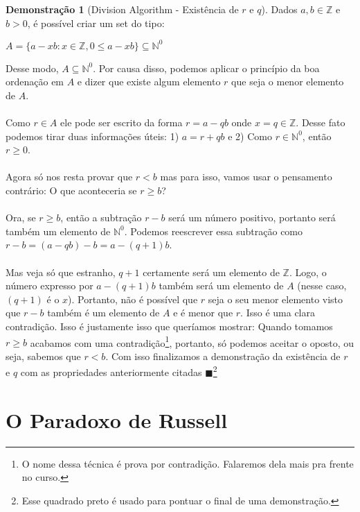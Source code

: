 \documentclass[a4paper,11pt]{book}
\theoremstyle{definition}
\theoremstyle{break}
\newtheorem{demonstration}{Demonstração}[section]
\begin{document}
\begin{demonstration}[Division Algorithm - Existência de $r$ e $q$]
Dados $a,b \in \mathbb{Z}$ e $b > 0$, é possível criar um set do tipo:
\begin{center}
	$ A = \{ a - xb : x \in \mathbb{Z}, 0 \leq a - xb \} \subseteq \mathbb{N}^0 $
\end{center}
Desse modo, $A \subseteq \mathbb{N}^0$. Por causa disso, podemos aplicar o princípio da boa ordenação em $A$ e dizer que existe algum elemento $r$ que seja o menor elemento de $A$.
\\
\\
Como $r \in A$ ele pode ser escrito da forma $r = a - qb$ onde $x = q \in \mathbb{Z}$. Desse fato podemos tirar duas informações úteis: 1) $a = r + qb$ e 2) Como $r \in \mathbb{N}^0$, então $r \geq 0$.
\\
\\
Agora só nos resta provar que $r < b$ mas para isso, vamos usar o pensamento contrário: O que aconteceria se $r \geq b$?
\\
\\
Ora, se $r \geq b$, então a subtração $r - b$ será um número positivo, portanto será também um elemento de $\mathbb{N}^0$. Podemos reescrever essa subtração como $r - b = (a - qb) - b = a - (q + 1)b$. 
\\
\\
Mas veja só que estranho, $q + 1$ certamente será um elemento de $\mathbb{Z}$. Logo, o número expresso por $a - (q + 1)b$ também será um elemento de $A$ (nesse caso, $(q + 1)$ é o $x$). Portanto, não é possível que $r$ seja o seu menor elemento visto que $r - b$ também é um elemento de $A$ e é menor que $r$. Isso é uma clara contradição. Isso é justamente isso que queríamos mostrar: Quando tomamos $r \geq b$ acabamos com uma contradição\footnote{O nome dessa técnica é prova por contradição. Falaremos dela mais pra frente no curso.}, portanto, só podemos aceitar o oposto, ou seja, sabemos que $r < b$. Com isso finalizamos a demonstração da existência de $r$ e $q$ com as propriedades anteriormente citadas $\blacksquare$\footnote{Esse quadrado preto é usado para pontuar o final de uma demonstração.}
\end{demonstration}


\section{O Paradoxo de Russell}
\end{document}
